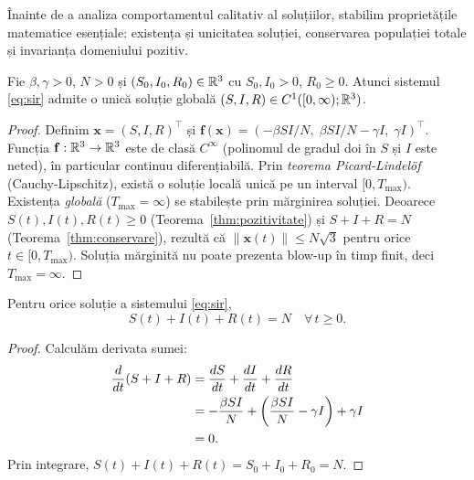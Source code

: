 Înainte de a analiza comportamentul calitativ al soluțiilor, stabilim proprietățile
matematice esențiale: existența și unicitatea soluției, conservarea populației totale
și invarianța domeniului pozitiv.

\begin{teorema}
\label{thm:existenta_unicitate}
Fie $\beta, \gamma > 0$, $N > 0$ și $(S_0, I_0, R_0) \in \mathbb{R}^3$ cu
$S_0, I_0 > 0$, $R_0 \geq 0$. Atunci sistemul \eqref{eq:sir} admite o
unică soluție globală $(S, I, R) \in C^1([0, \infty); \mathbb{R}^3)$.
\end{teorema}

\begin{proof}
Definim $\mathbf{x} = (S, I, R)^\intercal$ și
$\mathbf{f}(\mathbf{x}) = (-\beta SI/N,\; \beta SI/N - \gamma I,\; \gamma I)^\intercal$.
Funcția $\mathbf{f} : \mathbb{R}^3 \to \mathbb{R}^3$ este de clasă $C^\infty$ (polinomul de
gradul doi în $S$ și $I$ este neted), în particular continuu diferențiabilă.
Prin \emph{teorema Picard-Lindelöf} (Cauchy-Lipschitz), există o soluție locală
unică pe un interval $[0, T_{\max})$. \\
\indent Existența \emph{globală} ($T_{\max} = \infty$) se stabilește prin mărginirea
soluției. Deoarece $S(t), I(t), R(t) \geq 0$ (Teorema~\ref{thm:pozitivitate}) și
$S + I + R = N$ (Teorema~\ref{thm:conservare}), rezultă că $\|\mathbf{x}(t)\| \leq N\sqrt{3}$
pentru orice $t \in [0, T_{\max})$. Soluția mărginită nu poate prezenta blow-up în
timp finit, deci $T_{\max} = \infty$.
\end{proof}

\begin{teorema}
\label{thm:conservare}
Pentru orice soluție a sistemului \eqref{eq:sir},
\begin{equation}
    S(t) + I(t) + R(t) = N \quad \forall\, t \geq 0.
\end{equation}
\end{teorema}

\begin{proof}
Calculăm derivata sumei:
\begin{align*}
    \frac{d}{dt}(S + I + R) &= \frac{dS}{dt} + \frac{dI}{dt} + \frac{dR}{dt} \\
    &= -\frac{\beta S I}{N} + \left(\frac{\beta S I}{N} - \gamma I\right) + \gamma I \\
    &= 0.
\end{align*}
Prin integrare, $S(t) + I(t) + R(t) = S_0 + I_0 + R_0 = N$.
\end{proof}

